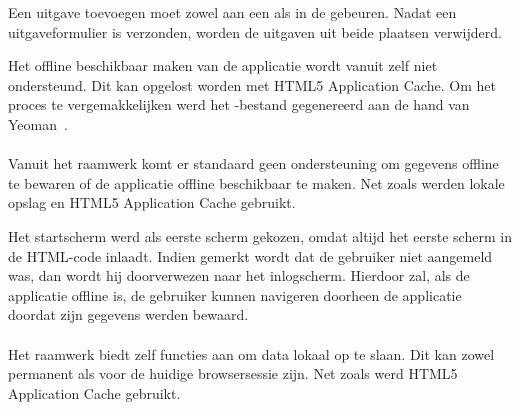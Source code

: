 Een uitgave toevoegen moet zowel aan een  als in de  gebeuren.
Nadat een uitgaveformulier is verzonden, worden de uitgaven uit beide plaatsen verwijderd.

Het offline beschikbaar maken van de applicatie wordt vanuit \kendo{} zelf niet ondersteund.
Dit kan opgelost worden met HTML5 Application Cache.
Om het proces te vergemakkelijken werd het -bestand gegenereerd aan de hand van Yeoman~\cite{Yeoman2013}.

\paragraph{\jqm}
Vanuit het raamwerk komt er standaard geen ondersteuning om gegevens offline te bewaren of de applicatie offline beschikbaar te maken.
Net zoals \kendo{} werden lokale opslag en HTML5 Application Cache gebruikt.

Het startscherm werd als eerste scherm gekozen, omdat \jqm{} altijd het eerste scherm in de HTML-code inlaadt.
Indien gemerkt wordt dat de gebruiker niet aangemeld was, dan wordt hij doorverwezen naar het inlogscherm.
Hierdoor zal, als de applicatie offline is, de gebruiker kunnen navigeren doorheen de applicatie doordat zijn gegevens werden bewaard.

\paragraph{\lungo}
Het raamwerk biedt zelf functies aan om data lokaal op te slaan.
Dit kan zowel permanent als voor de huidige browsersessie zijn.
Net zoals \kendo{} werd HTML5 Application Cache gebruikt.